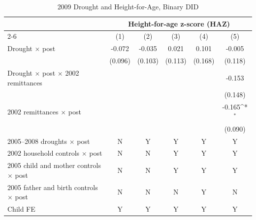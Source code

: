\documentclass[12pt]{article}
\def\sym#1{\ifmmode^{#1}\else\(^{#1}\)\fi}
\begin{document}
\begingroup
\footnotesize
\renewcommand{\arraystretch}{0.86}
\setlength{\tabcolsep}{4pt}
\setlength{\LTcapwidth}{\textwidth}
\begin{longtable}{l*{5}{c}}
\caption{2009 Drought and Height-for-Age, Binary DID}\\
\toprule
 & \multicolumn{5}{c}{Height-for-age z-score (HAZ)}\\
\cmidrule(lr){2-6}
            &\multicolumn{1}{c}{(1)}         &\multicolumn{1}{c}{(2)}         &\multicolumn{1}{c}{(3)}         &\multicolumn{1}{c}{(4)}         &\multicolumn{1}{c}{(5)}         \\
\midrule
Drought \ensuremath{\times} post&      -0.072         &      -0.035         &       0.021         &       0.101         &      -0.005         \\
            &     (0.096)         &     (0.103)         &     (0.113)         &     (0.168)         &     (0.118)         \\
Drought \ensuremath{\times} post \ensuremath{\times} 2002 remittances&                     &                     &                     &                     &      -0.153         \\
            &                     &                     &                     &                     &     (0.148)         \\
2002 remittances \ensuremath{\times} post&                     &                     &                     &                     &      -0.165\sym{*}  \\
            &                     &                     &                     &                     &     (0.090)         \\
\midrule
2005--2008 droughts \ensuremath{\times} post&           N         &           Y         &           Y         &           Y         &           Y         \\
2002 household controls \ensuremath{\times} post&           N         &           N         &           Y         &           Y         &           Y         \\
2005 child and mother controls \ensuremath{\times} post&           N         &           N         &           Y         &           Y         &           Y         \\
2005 father and birth controls \ensuremath{\times} post&           N         &           N         &           N         &           Y         &           N         \\
Child FE    &           Y         &           Y         &           Y         &           Y         &           Y         \\

\end{longtable}
\end{document}
